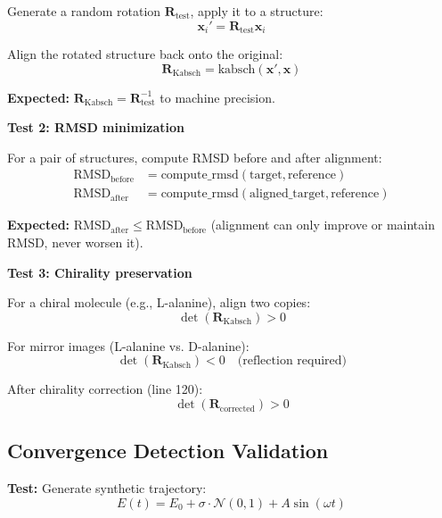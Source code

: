 \documentclass[11pt]{article}
\begin{document}
Generate a random rotation $\mathbf{R}_{\text{test}}$, apply it to a structure:
\begin{equation}
\mathbf{x}_i' = \mathbf{R}_{\text{test}} \mathbf{x}_i
\end{equation}

Align the rotated structure back onto the original:
\begin{equation}
\mathbf{R}_{\text{Kabsch}} = \text{kabsch}(\mathbf{x}', \mathbf{x})
\end{equation}

\textbf{Expected:} $\mathbf{R}_{\text{Kabsch}} = \mathbf{R}_{\text{test}}^{-1}$ to machine precision.

\textbf{Test 2: RMSD minimization}

For a pair of structures, compute RMSD before and after alignment:
\begin{align}
\text{RMSD}_{\text{before}} &= \text{compute\_rmsd}(\text{target}, \text{reference}) \\
\text{RMSD}_{\text{after}} &= \text{compute\_rmsd}(\text{aligned\_target}, \text{reference})
\end{align}

\textbf{Expected:} $\text{RMSD}_{\text{after}} \leq \text{RMSD}_{\text{before}}$ (alignment can only improve or maintain RMSD, never worsen it).

\textbf{Test 3: Chirality preservation}

For a chiral molecule (e.g., L-alanine), align two copies:
\begin{equation}
\det(\mathbf{R}_{\text{Kabsch}}) > 0
\end{equation}

For mirror images (L-alanine vs. D-alanine):
\begin{equation}
\det(\mathbf{R}_{\text{Kabsch}}) < 0 \quad \text{(reflection required)}
\end{equation}

After chirality correction (line 120):
\begin{equation}
\det(\mathbf{R}_{\text{corrected}}) > 0
\end{equation}

\subsection{Convergence Detection Validation}

\textbf{Test:} Generate synthetic trajectory:
\begin{equation}
E(t) = E_0 + \sigma \cdot \mathcal{N}(0,1) + A\sin(\omega t)
\end{equation}
\end{document}
